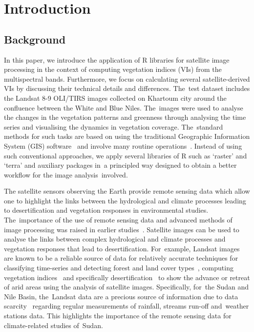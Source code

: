 \documentclass[jimaging,article,accept,pdftex,moreauthors]{Definitions/mdpi}
\begin{document}
\section{Introduction}
\unskip

\subsection{Background}

In this paper, we introduce the application of R libraries for satellite image processing in the context of computing vegetation indices (VIs) from the multispectral bands. Furthermore, we focus on calculating several satellite-derived VIs by discussing their technical details and differences. The~test dataset includes the Landsat 8-9 OLI/TIRS images collected on Khartoum city around the confluence between the White and Blue Niles. The~images were used to analyse the changes in the vegetation patterns and greenness through analysing the time series and visualising the dynamics in vegetation coverage. The~standard methods for such tasks are based on using the traditional Geographic Information System (GIS) %
 software~\cite{AHMED201829} and involve many routine operations~\cite{Hawash,YOUSSEF2020103777,6621869,Aldoma}. Instead of using such conventional approaches, we apply several libraries of R such as `raster' and `terra' and auxiliary packages in~a principled way designed to obtain a better workflow for the image analysis~involved.

The satellite sensors observing the Earth provide remote sensing data which allow one to highlight the links between the hydrological and climate processes leading to desertification and vegetation responses in environmental studies. The~importance of the use of remote sensing data and advanced methods of image processing was raised in earlier \mbox{studies~\cite{su14137871,ELBASTAWESY2017252,SOSNOWSKI201651,GORSEVSKI201364}.} Satellite images can be used to analyse the links between complex hydrological and climate processes and vegetation responses that lead to desertification. For~example, Landsat images are known to be a reliable source of data for relatively accurate techniques for classifying time-series and detecting forest and land cover types~\cite{WILSON2002385,Lemenkova202227,4293065,SALIH2017S21}, computing vegetation indices~\cite{5416935,Lemenkova202229,1026428} and specifically desertification~\cite{RIVERAMARIN2022104829} to show the advance or retreat of arid areas using the analysis of satellite images. Specifically, for~the Sudan and Nile Basin, the~Landsat data are a precious source of information due to data scarcity~\cite{Ali} regarding regular measurements of rainfall, streams run-off and~weather stations data. This highlights the importance of the remote sensing data for climate-related studies of~Sudan.
\end{document}
